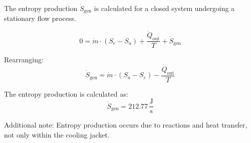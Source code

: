 The entropy production \( \dot{S}_{\text{gen}} \) is calculated for a closed system undergoing a stationary flow process.  

\[
0 = \dot{m} \cdot (S_e - S_a) + \frac{\dot{Q}_{\text{out}}}{T} + \dot{S}_{\text{gen}}
\]

Rearranging:  
\[
\dot{S}_{\text{gen}} = \dot{m} \cdot (S_a - S_e) - \frac{\dot{Q}_{\text{out}}}{T}
\]

The entropy production is calculated as:  
\[
\dot{S}_{\text{gen}} = 212.77 \, \frac{\text{J}}{\text{s}}
\]

Additional note: Entropy production occurs due to reactions and heat transfer, not only within the cooling jacket.